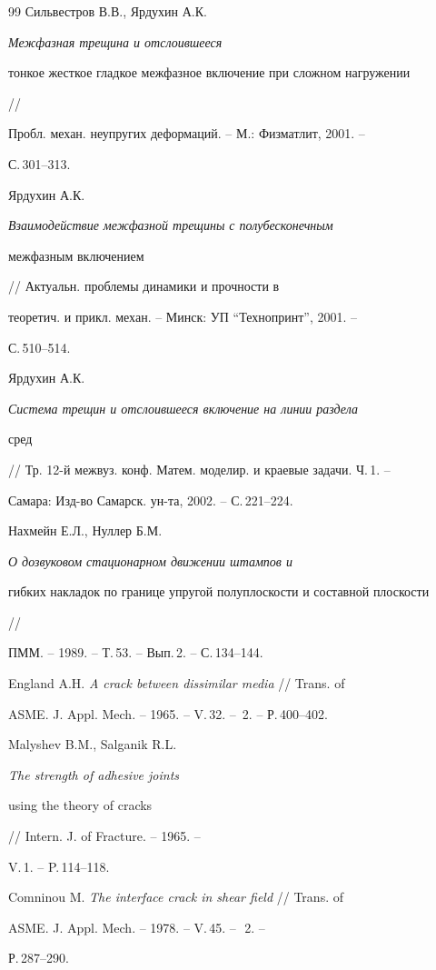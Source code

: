 \begin{thebibliography}{99}
Сильвестров В.В., Ярдухин А.К. {\em Межфазная трещина и отслоившееся 


тонкое жесткое гладкое межфазное включение при сложном нагружении} // 


Пробл. механ. неупругих деформаций. -- М.: Физматлит, 2001. -- 


С.\,301--313. 




Ярдухин А.К. {\em Взаимодействие межфазной трещины с полубесконечным 


межфазным включением} // Актуальн. проблемы динамики и прочности в 


теоретич. и прикл. механ. -- Минск: УП ``Технопринт'', 2001. -- 


С.\,510--514. 




Ярдухин А.К. {\em Система трещин и отслоившееся включение на линии раздела 


сред} // Тр. 12-й межвуз. конф. Матем. моделир. и краевые задачи. Ч.\,1. -- 


Самара: Изд-во Самарск. ун-та, 2002. -- С.\,221--224. 




Нахмейн Е.Л., Нуллер Б.М. {\em О дозвуковом стационарном движении штампов и 


гибких накладок по границе упругой полуплоскости и составной плоскости} // 


ПММ. -- 1989. -- Т.\,53. -- Вып.\,2. -- С.\,134--144. 




England A.H. {\em A crack between dissimilar media} // Trans. of 


ASME. J. Appl. Mech. -- 1965. -- V.\,32. -- \No\,2. -- Р.\,400--402. 




Malyshev B.M., Salganik R.L. {\em The strength of adhesive joints 


using the theory of cracks} // Intern. J. of Fracture. -- 1965. -- 


V.\,1. -- P.\,114--118. 




Comninou M. {\em The interface crack in shear field} // Trans. of 


ASME. J. Appl. Mech. -- 1978. -- V.\,45. -- \No\,\,2. -- 


Р.\,287--290. 





\end{thebibliography}
